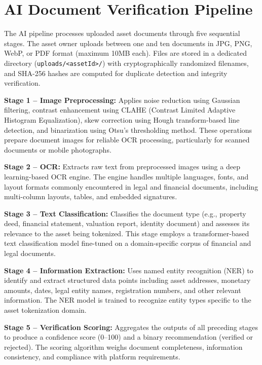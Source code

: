 \documentclass[conference]{IEEEtran}
\begin{document}
\section{AI Document Verification Pipeline}
\label{sec:ai}

The AI pipeline processes uploaded asset documents through five sequential stages. The asset owner uploads between one and ten documents in JPG, PNG, WebP, or PDF format (maximum 10MB each). Files are stored in a dedicated directory (\texttt{uploads/<assetId>/}) with cryptographically randomized filenames, and SHA-256 hashes are computed for duplicate detection and integrity verification.

\textbf{Stage 1 -- Image Preprocessing:} Applies noise reduction using Gaussian filtering, contrast enhancement using CLAHE (Contrast Limited Adaptive Histogram Equalization), skew correction using Hough transform-based line detection, and binarization using Otsu's thresholding method. These operations prepare document images for reliable OCR processing, particularly for scanned documents or mobile photographs.

\textbf{Stage 2 -- OCR:} Extracts raw text from preprocessed images using a deep learning-based OCR engine. The engine handles multiple languages, fonts, and layout formats commonly encountered in legal and financial documents, including multi-column layouts, tables, and embedded signatures.

\textbf{Stage 3 -- Text Classification:} Classifies the document type (e.g., property deed, financial statement, valuation report, identity document) and assesses its relevance to the asset being tokenized. This stage employs a transformer-based text classification model fine-tuned on a domain-specific corpus of financial and legal documents.

\textbf{Stage 4 -- Information Extraction:} Uses named entity recognition (NER) to identify and extract structured data points including asset addresses, monetary amounts, dates, legal entity names, registration numbers, and other relevant information. The NER model is trained to recognize entity types specific to the asset tokenization domain.

\textbf{Stage 5 -- Verification Scoring:} Aggregates the outputs of all preceding stages to produce a confidence score (0--100) and a binary recommendation (verified or rejected). The scoring algorithm weighs document completeness, information consistency, and compliance with platform requirements.
\end{document}
